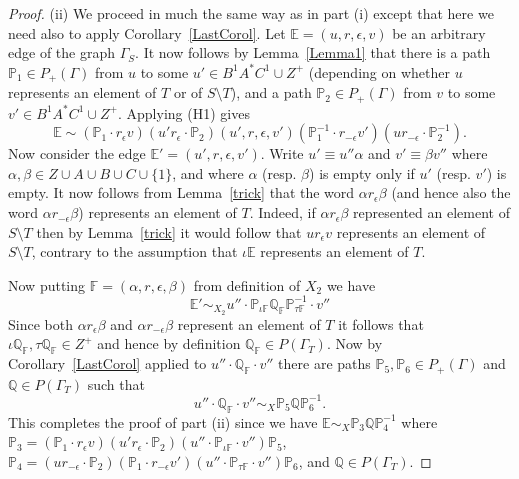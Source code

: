 \documentclass[11pt]{amsart}
\theoremstyle{plain}
\begin{document}
\begin{proof}
(ii) We proceed in much the same way as in part (i) except that here we need also to apply Corollary~\ref{LastCorol}.  Let ${\mathbb{E}} = (u,r,\epsilon,v)$ be an arbitrary edge of the graph $\Gamma_S$. It now follows by Lemma~\ref{Lemma1} that there is a path ${\mathbb{P}}_1 \in P_+(\Gamma)$ from $u$ to some $u' \in B^1 A^* C^1 \cup Z^+$ (depending on whether $u$ represents an element of $T$ or of $S \setminus T$), and a path ${\mathbb{P}}_2 \in P_+(\Gamma)$ from $v$ to some $v' \in B^1 A^* C^1 \cup Z^+$. Applying (H1) gives
\[
{\mathbb{E}} \sim
({\mathbb{P}}_1 \cdot r_{\epsilon} v) (u' r_{\epsilon} \cdot {\mathbb{P}}_2)
(u', r, \epsilon, v')
({\mathbb{P}}_1^{-1} \cdot r_{-\epsilon} v') (u r_{-\epsilon} \cdot {\mathbb{P}}_2^{-1}).
\]
Now consider the edge ${\mathbb{E}}' = (u', r, \epsilon, v')$. Write $u' \equiv u'' \alpha$ and $v' \equiv \beta v''$ where $\alpha, \beta \in Z \cup A \cup B \cup C \cup \{1 \}$, and where $\alpha$ (resp. $\beta$) is empty only if $u'$ (resp. $v'$) is empty. It now follows from Lemma~\ref{trick} that the word $\alpha r_{\epsilon} \beta$ (and hence also the word $\alpha r_{-\epsilon} \beta$) represents an element of $T$. Indeed, if $\alpha r_{\epsilon} \beta$ represented an element of $S \setminus T$ then by Lemma~\ref{trick} it would follow that $u r_{\epsilon} v$ represents an element of $S \setminus T$, contrary to the assumption that $\iota {\mathbb{E}}$ represents an element of $T$.  

Now putting ${\mathbb{F}} = (\alpha, r, \epsilon, \beta)$ from definition of $X_2$ we have
\[
{\mathbb{E}}' \sim_{X_2} u'' \cdot {\mathbb{P}}_{\iota {\mathbb{F}}} {\mathbb{Q}}_{\mathbb{F}} {\mathbb{P}}_{\tau {\mathbb{F}}}^{-1} \cdot v''
\]
Since both $\alpha r_{\epsilon} \beta$ and $\alpha r_{-\epsilon} \beta$ represent an element of $T$ it follows that $\iota {\mathbb{Q}}_{\mathbb{F}}, \tau {\mathbb{Q}}_{\mathbb{F}} \in Z^+$ and hence by definition ${\mathbb{Q}}_{\mathbb{F}} \in P(\Gamma_T)$. Now by Corollary~\ref{LastCorol} applied to $u'' \cdot {\mathbb{Q}}_{\mathbb{F}} \cdot v''$ there are paths ${\mathbb{P}}_5, {\mathbb{P}}_6 \in P_+(\Gamma)$ and ${\mathbb{Q}} \in P(\Gamma_T)$ such that
\[
u'' \cdot {\mathbb{Q}}_{\mathbb{F}} \cdot v'' \sim_X {\mathbb{P}}_5 {\mathbb{Q}} {\mathbb{P}}_6^{-1}.
\]
This completes the proof of part (ii) since we have 
$
{\mathbb{E}} \sim_{X} {\mathbb{P}}_3 {\mathbb{Q}} {\mathbb{P}}_4^{-1}
$
where ${\mathbb{P}}_3 = ({\mathbb{P}}_1 \cdot r_{\epsilon} v) (u' r_{\epsilon} \cdot {\mathbb{P}}_2) (u'' \cdot {\mathbb{P}}_{\iota {\mathbb{F}}} \cdot v'') {\mathbb{P}}_5$,
${\mathbb{P}}_4 = (u r_{-\epsilon} \cdot {\mathbb{P}}_2) ({\mathbb{P}}_1 \cdot r_{-\epsilon} v') (u'' \cdot {\mathbb{P}}_{\tau {\mathbb{F}}} \cdot v'') {\mathbb{P}}_6$, and ${\mathbb{Q}} \in P(\Gamma_T)$.
\end{proof}
\end{document}
